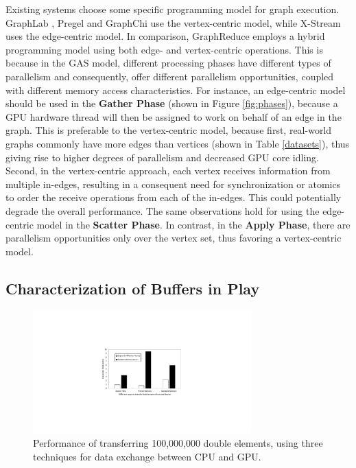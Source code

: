 Existing systems choose some specific programming model for graph execution. GraphLab \cite{graphlab}, Pregel \cite{pregel} and GraphChi \cite{chi} use the 
vertex-centric model, while X-Stream \cite{xstream} uses the edge-centric model. In comparison, GraphReduce employs a hybrid programming model
using both edge- and vertex-centric operations. This is because in the GAS model, different processing phases have different 
types of parallelism and consequently, offer different parallelism opportunities, coupled with different memory access characteristics. 
For instance, an edge-centric model should be used in the {\bf Gather Phase} (shown in Figure \ref{fig:phases}), because a GPU hardware thread 
will then be assigned to work on behalf of an edge in the graph. This is preferable to the vertex-centric model, because first,
real-world graphs commonly have more edges than vertices (shown in Table \ref{datasets}), thus giving rise to higher degrees of
parallelism and decreased GPU core idling. Second, in the vertex-centric approach, each vertex receives information from multiple in-edges, 
resulting in a consequent need for synchronization or atomics to order the receive operations from each of the in-edges. This could potentially degrade 
the overall performance. The same observations hold for using the edge-centric model in the {\bf Scatter Phase}. In contrast, 
in the {\bf Apply Phase}, there are parallelism opportunities only over the vertex set, thus favoring a vertex-centric model.

\subsection{Characterization of Buffers in Play}
\label{3.1}

\begin{figure}[!t]
\centering
\includegraphics[width=0.75\textwidth,height=\textheight,keepaspectratio]{figures/transfer.pdf}
\caption{Performance of transferring 100,000,000 double elements, using three techniques for data exchange between CPU and GPU.  }
\label{fig:transfer}
\end{figure}

